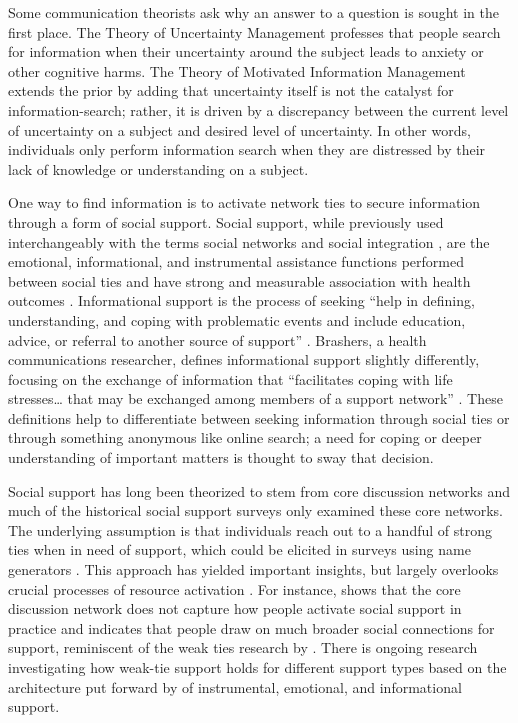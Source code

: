Some communication theorists ask why an answer to a question is sought in the
first place. The Theory of Uncertainty Management
\citep{brashersCommunicationUncertaintyManagement2001} professes that people
search for information when their uncertainty around the subject leads to
anxiety or other cognitive harms. The Theory of Motivated Information Management
\citep{afifiTheoryMotivatedInformation2004, afifiSeekingInformationSexual2006}
extends the prior by adding that uncertainty itself is not the catalyst for
information-search; rather, it is driven by a discrepancy between the current
level of uncertainty on a subject and desired level of uncertainty. In other
words, individuals only perform information search when they are distressed by
their lack of knowledge or understanding on a subject.

One way to find information is to activate network ties to secure information
through a form of social support. Social support, while previously used
interchangeably with the terms social networks and social integration
\citep{houseStructuresProcessesSocial1988}, are the emotional, informational,
and instrumental assistance functions performed between social ties and have
strong and measurable association with health outcomes
\citep{houseMeasuresConceptsSocial1985, thoitsMechanismsLinkingSocial2011}.
Informational support is the process of seeking ``help in defining,
understanding, and coping with problematic events and include education, advice,
or referral to another source of support'' \citep[][p. 640]{winemiller_etal93}.
Brashers, a health communications researcher, defines informational support
slightly differently, focusing on the exchange of information that ``facilitates
coping with life stresses… that may be exchanged among members of a support
network'' \citet[][p. 260]{brashersInformationSeekingAvoiding2002}. These
definitions help to differentiate between seeking information through social
ties or through something anonymous like online search; a need for coping or
deeper understanding of important matters is thought to sway that decision.

Social support has long been theorized to stem from core discussion networks and
much of the historical social support surveys only examined these core networks.
The underlying assumption is that individuals reach out to a handful of strong
ties when in need of support, which could be elicited in surveys using name
generators \citep{marsdenCoreDiscussionNetworks1987}. This approach has yielded
important insights, but largely overlooks crucial processes of resource
activation \citep{hurlbertCoreNetworksTie2000, perrySocialNetworkActivation2015,
smithDonPutMy2005}. For instance, \citet{smallSomeoneTalk2017} shows that
the core discussion network does not capture how people activate social support
in practice and indicates that people draw on much broader social connections
for support, reminiscent of the weak ties research by \citet{granovetterStrengthWeakTies1973}.
There is ongoing research investigating
how weak-tie support holds for different support types based on the architecture
put forward by \citet{houseStructuresProcessesSocial1988} of instrumental,
emotional, and informational support.

